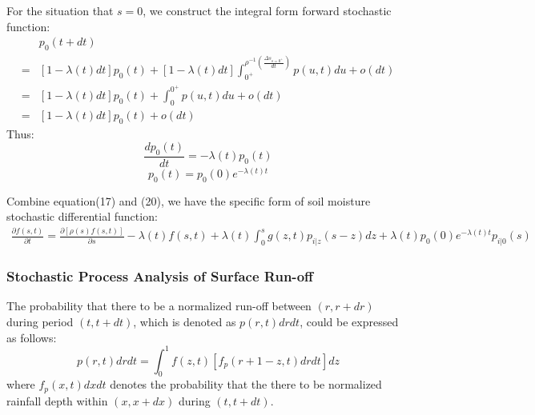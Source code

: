 \documentclass[11pt]{article}
\begin{document}
 For the situation that $s=0$, we construct the integral form forward stochastic function:
 \begin{equation}
 \begin{split}
 &p_0(t+dt)\\=&[1-\lambda(t)dt]p_0(t)+[1-\lambda(t)dt]\int_{0^+}^{\rho^{-1}(\frac{\Delta s_{s=0^+}}{dt})}p(u,t)du+o(dt)\\=&[1-\lambda(t)dt]p_0(t)+\int_0^{0^+} p(u,t)du+o(dt)\\=&[1-\lambda(t)dt]p_0(t)+o(dt)
 \end{split}
 \end{equation} 
 Thus:
 \begin{equation}
 \frac{dp_0(t)}{dt}=-\lambda(t) p_0(t)
 \end{equation}
 \begin{equation}
 p_0(t)=p_0(0)e^{-\lambda(t) t}
 \end{equation}

 Combine equation(17) and (20), we have the specific form of soil moisture stochastic differential function:  
 \begin{equation}
 \begin{split}
 \frac{\partial{f(s,t)}}{\partial t}=\frac{\partial{[\rho(s)f(s,t)]}}{\partial s}-\lambda(t)f(s,t)+\lambda(t)\int_{0}^{s} g(z,t)p_{i|z}(s-z)dz+\lambda(t)p_0(0)e^{-\lambda(t) t}p_{i|0}(s)
 \end{split}
 \end{equation}
\iffalse
 We could also define $p_1(t)$ to denote the probability that the soil is saturated at time t. 
 \begin{equation}
 \begin{split}
 p_1(t)\equiv&\int_{1^-}^1 f(z,t)dz\\=&1-\int_{0}^{1^-} f(z,t)dz
 \end{split}
 \end{equation}
\fi






 \subsubsection{Stochastic Process Analysis of Surface Run-off}
 The probability that there to be a normalized run-off between $(r,r+dr)$ during period $(t,t+dt)$, which is denoted as $p(r,t)drdt$, could be expressed as follows:
 \begin{equation}
 p(r,t)drdt=\int_{0}^{1} f(z,t)[f_p(r+1-z,t)drdt]dz
 \end{equation}
where $f_p(x,t)dxdt$ denotes the probability that the there to be normalized rainfall depth within $(x, x+dx)$ during $(t, t+dt)$. 
\end{document}
